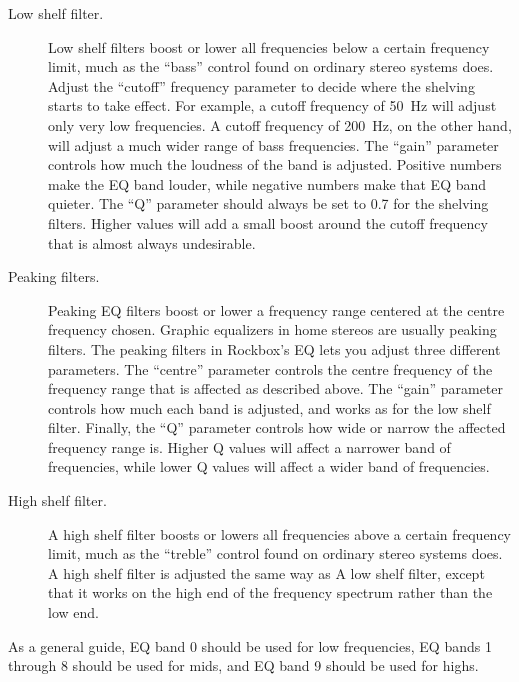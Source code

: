   \begin{description}
  \item[Low shelf filter.]
        Low shelf filters boost or lower all frequencies below a certain
        frequency limit, much as the ``bass'' control found on ordinary
        stereo systems does.
        Adjust the ``cutoff'' frequency parameter to decide where the shelving
        starts to take effect. For example, a cutoff frequency of 50~Hz will
        adjust only very low frequencies. A cutoff frequency of 200~Hz, on the
        other hand, will adjust a much wider range of bass frequencies.
        The ``gain'' parameter controls how much the loudness of the band is
        adjusted. Positive numbers make the EQ band louder, while negative
        numbers make that EQ band quieter.
        The ``Q'' parameter should always be set to 0.7 for the shelving
        filters. Higher values will add a small boost around the cutoff
        frequency that is almost always undesirable.
  \item[Peaking filters.]
        Peaking EQ filters boost or lower a frequency range centered at the
        centre frequency chosen.
        Graphic equalizers in home stereos are usually peaking
        filters. The peaking filters in Rockbox's EQ lets you adjust three
        different parameters. The ``centre'' parameter
        controls the centre frequency of the frequency range that is affected
        as described above.
        The ``gain'' parameter controls how much each band is adjusted, and
        works as for the low shelf filter.
        Finally, the ``Q'' parameter controls how wide or narrow the affected
        frequency range is. Higher Q values will affect a narrower band of
        frequencies, while lower Q values will affect a wider band of
        frequencies.
  \item[High shelf filter.]
        A high shelf filter boosts or lowers all frequencies above a certain
        frequency limit, much as the ``treble'' control found on ordinary
        stereo systems does.
        A high shelf filter is adjusted the same way as A low shelf filter,
        except that it works on the high end of the frequency spectrum rather
        than the low end.
  \end{description}
  As a general guide, EQ band 0 should be used for low frequencies, EQ bands 1
  through 8 should be used for mids, and EQ band 9 should be used for highs.

